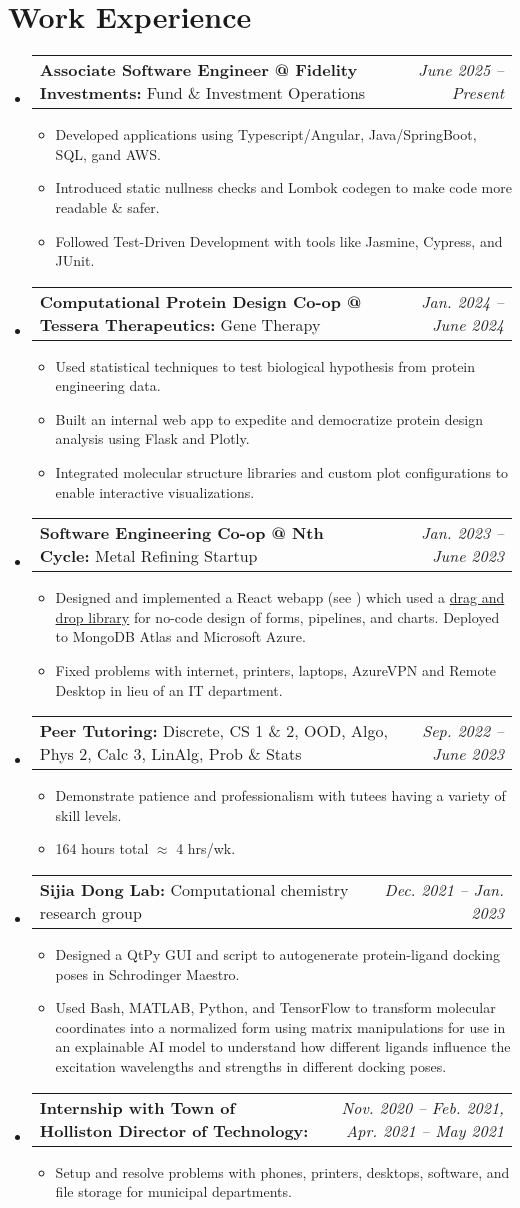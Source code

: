 \documentclass[letterpaper,11pt]{article}
\makeatletter
\newcommand{\resumeBullet}[1]{
  \item\small{
    #1 \vspace{-2pt}
  }
}
\newcommand{\resumeSubheadingThin}[3]{
  \vspace{-1pt}\item
    \begin{tabular*}{0.97\textwidth}[t]{l@{\extracolsep{\fill}}r}
      \small\textbf{#1:} #3 & \small\textit{#2} 
    \end{tabular*}\vspace{-7pt}
}
\newcommand{\resumeSubHeadingListStart}{\begin{itemize}[leftmargin=*]}
\newcommand{\resumeSubHeadingListEnd}{\end{itemize}}
\newcommand{\resumeItemListStart}{\begin{itemize}}
\newcommand{\resumeItemListEnd}{\end{itemize}\vspace{-5pt}}
\makeatother
\begin{document}
  \section{Work Experience}
  
  \resumeSubHeadingListStart
  \resumeSubheadingThin{Associate Software Engineer @ Fidelity Investments}{June 2025 -- Present}{Fund \& Investment Operations}
  \resumeItemListStart
  \resumeBullet{Developed applications using Typescript/Angular, Java/SpringBoot, SQL, gand AWS.}
  \resumeBullet{Introduced static nullness checks and Lombok codegen to make code more readable \& safer.}
  \resumeBullet{Followed Test-Driven Development with tools like Jasmine, Cypress, and JUnit.}
  \resumeItemListEnd
  \resumeSubheadingThin{Computational Protein Design Co-op @ Tessera Therapeutics}{Jan. 2024 -- June 2024}{Gene Therapy}
  \resumeItemListStart
  \resumeBullet{Used statistical techniques to test biological hypothesis from protein engineering data.}
  \resumeBullet{Built an internal web app to expedite and democratize protein design analysis using Flask and Plotly.}
  \resumeBullet{Integrated molecular structure libraries and custom plot configurations to enable interactive visualizations.}
  \resumeItemListEnd
  \resumeSubheadingThin{Software Engineering Co-op @ Nth Cycle}{Jan. 2023 -- June 2023}{Metal Refining Startup}
  \resumeItemListStart
  \resumeBullet{Designed and implemented a React webapp (see \ghlink{lucas-demo-screenshots}) which used a  \href{
  https://developers.google.com/blockly}{drag and drop library} for no-code design of forms, pipelines, and charts. Deployed to MongoDB Atlas and Microsoft Azure.}

  \resumeBullet{Fixed problems with internet, printers, laptops, AzureVPN and Remote Desktop in lieu of an IT department.}
  \resumeItemListEnd
  \resumeSubheadingThin{Peer Tutoring}{Sep. 2022 -- June 2023}{Discrete, CS 1 \& 2, OOD, Algo, Phys 2, Calc 3, LinAlg, Prob \& Stats}
  \resumeItemListStart
    \resumeBullet{Demonstrate patience and professionalism with tutees having a variety of skill levels.} 
    \resumeBullet{164 hours total $\approx$ 4 hrs/wk.}
  \resumeItemListEnd
  \resumeSubheadingThin{Sijia Dong Lab}{Dec. 2021 -- Jan. 2023}{Computational
  chemistry research group} \resumeItemListStart 
  \resumeBullet{\href{
  \ghurl{automated_docking_script}}{\faIcon{link}} Designed a QtPy GUI and script to autogenerate protein-ligand docking poses in Schrodinger Maestro. }
  \resumeBullet{\href{https://doi.org/10.26434/chemrxiv-2024-cjs5j}{\faIcon{link}} Used Bash, MATLAB, Python, and TensorFlow to transform molecular coordinates into a normalized form using matrix manipulations for use in an explainable AI model to understand how different ligands influence the excitation wavelengths and strengths in different docking poses.}
\resumeItemListEnd
  \resumeSubheadingThin{Internship with Town of Holliston Director of Technology}{Nov. 2020 -- Feb. 2021, Apr. 2021 -- May 2021}{}
  \resumeItemListStart
    \resumeBullet{Setup and resolve problems with phones, printers, desktops, software, and file storage for municipal departments.}
  \resumeItemListEnd \resumeSubHeadingListEnd
\end{document}
